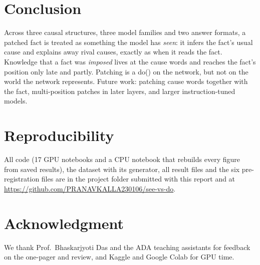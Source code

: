 \documentclass[conference]{IEEEtran}
\begin{document}
\section{Conclusion}
Across three causal structures, three model families and two answer formats, a patched fact is treated as something the model has \emph{seen}: it infers the fact's usual cause and explains away rival causes, exactly as when it reads the fact. Knowledge that a fact was \emph{imposed} lives at the cause words and reaches the fact's position only late and partly. Patching is a do() on the network, but not on the world the network represents. Future work: patching cause words together with the fact, multi-position patches in later layers, and larger instruction-tuned models.

\section*{Reproducibility}
All code (17 GPU notebooks and a CPU notebook that rebuilds every figure from saved results), the dataset with its generator, all result files and the six pre-registration files are in the project folder submitted with this report and at \url{https://github.com/PRANAVKALLA230106/see-vs-do}.

\section*{Acknowledgment}
We thank Prof.\ Bhaskarjyoti Das and the ADA teaching assistants for feedback on the one-pager and review, and Kaggle and Google Colab for GPU time.
\end{document}
